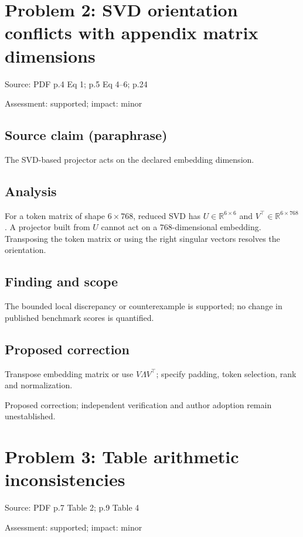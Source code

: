 \documentclass[11pt]{article}
\begin{document}
\section*{Problem 2: SVD orientation conflicts with appendix matrix dimensions}

Source: PDF p.4 Eq 1; p.5 Eq 4–6; p.24

Assessment: supported; impact: minor

\subsection*{Source claim (paraphrase)}

The SVD-based projector acts on the declared embedding dimension.

\subsection*{Analysis}

For a token matrix of shape \(6\times768\), reduced SVD has \(U\in\mathbb R^{6\times6}\) and \(V^\top\in\mathbb R^{6\times768}\). A projector built from \(U\) cannot act on a \(768\)-dimensional embedding. Transposing the token matrix or using the right singular vectors resolves the orientation.

\subsection*{Finding and scope}

The bounded local discrepancy or counterexample is supported; no change in published benchmark scores is quantified.

\subsection*{Proposed correction}

Transpose embedding matrix or use \(V\Lambda V^\top\); specify padding, token selection, rank and normalization.

Proposed correction; independent verification and author adoption remain unestablished.

\section*{Problem 3: Table arithmetic inconsistencies}

Source: PDF p.7 Table 2; p.9 Table 4

Assessment: supported; impact: minor
\end{document}

